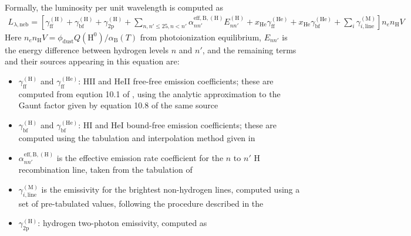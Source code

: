 \documentclass[letterpaper,10pt,english]{sphinxmanual}
\begin{document}
Formally, the luminosity per unit wavelength is computed as
\begin{equation*}
\begin{split}L_{\lambda,\mathrm{neb}} = \left[\gamma_{\mathrm{ff}}^{(\mathrm{H})} + \gamma_{\mathrm{bf}}^{(\mathrm{H})} + \gamma_{\mathrm{2p}}^{(\mathrm{H})} + \sum_{n,n' \leq 25, n<n'} \alpha_{nn'}^{\mathrm{eff,B,(H)}} E_{nn'}^{(\mathrm{H})} +  x_{\mathrm{He}} \gamma_{\mathrm{ff}}^{(\mathrm{He})} +  x_{\mathrm{He}} \gamma_{\mathrm{bf}}^{(\mathrm{He})} + \sum_i \gamma_{i,\mathrm{line}}^{(\mathrm{M})}\right] n_e n_{\mathrm{H}}{V}\end{split}
\end{equation*}
Here \(n_e n_{\mathrm{H}} V = \phi_{\mathrm{dust}} Q(\mathrm{H}^0)/ \alpha_{\mathrm{B}}(T)\) from photoionization equilibrium, \(E_{nn'}\) is the energy difference between hydrogen levels \(n\) and \(n'\), and the remaining terms and their sources appearing in this equation are:
\begin{itemize}
\item {} 
\(\gamma_{\mathrm{ff}}^{(\mathrm{H})}\) and \(\gamma_{\mathrm{ff}}^{(\mathrm{He})}\): HII and HeII free-free emission coefficients; these are computed from eqution 10.1 of , using the analytic approximation to the Gaunt factor given by equation 10.8 of the same source

\item {} 
\(\gamma_{\mathrm{bf}}^{(\mathrm{H})}\) and \(\gamma_{\mathrm{bf}}^{(\mathrm{He})}\): HI and HeI bound-free emission coefficients; these are computed using the tabulation and interpolation method given in 

\item {} 
\(\alpha_{nn'}^{\mathrm{eff,B,(H)}}\) is the effective emission rate coefficient for the \(n\) to \(n'\) H recombination line, taken from the tabulation of 

\item {} 
\(\gamma_{i,\mathrm{line}}^{(\mathrm{M})}\) is the emissivity for the brightest non-hydrogen lines, computed using a set of pre-tabulated values, following the procedure described in the 

\item {} 
\(\gamma_{\mathrm{2p}}^{(\mathrm{H})}\): hydrogen two-photon emissivity, computed as

\end{itemize}
\end{document}
